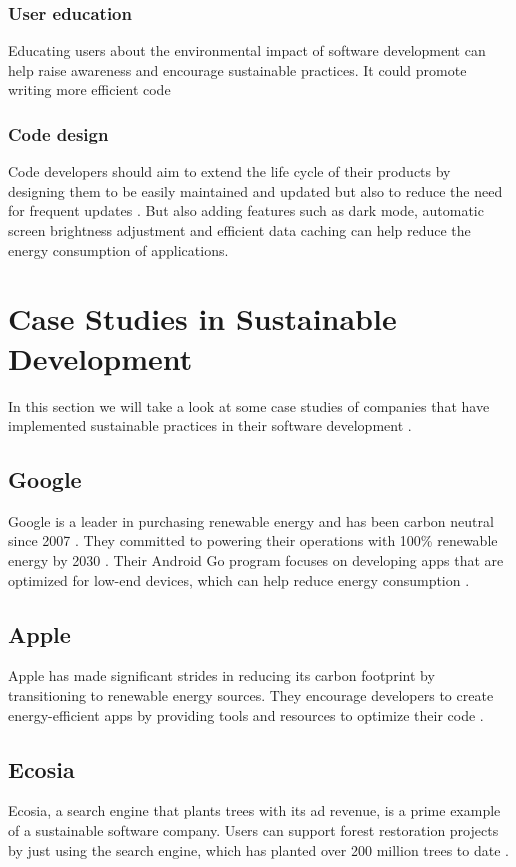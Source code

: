 \subsubsection{User education}
Educating users about the environmental impact of software development can help raise awareness and encourage sustainable practices.
It could promote writing more efficient code

\subsubsection{Code design}
Code developers should aim to extend the life cycle of their products by designing them to be easily maintained and updated but also to reduce the need for frequent updates \autocite{zudu}.
But also adding features such as dark mode, automatic screen brightness adjustment and efficient data caching can help reduce the energy consumption of applications.

\section{Case Studies in Sustainable Development}
In this section we will take a look at some case studies of companies that have implemented sustainable practices in their software development \autocite{linkedin}.

\subsection{Google}
Google is a leader in purchasing renewable energy and has been carbon neutral since 2007 \autocite{google}. They committed to powering their operations with 100\% renewable energy by 2030 \autocite{googlecloud}.
Their Android Go program focuses on developing apps that are optimized for low-end devices, which can help reduce energy consumption \autocite{linkedin}.

\subsection{Apple}
Apple has made significant strides in reducing its carbon footprint by transitioning to renewable energy sources. 
They encourage developers to create energy-efficient apps by providing tools and resources to optimize their code \autocite{linkedin}.

\subsection{Ecosia}
Ecosia, a search engine that plants trees with its ad revenue, is a prime example of a sustainable software company. 
Users can support forest restoration projects by just using the search engine, which has planted over 200 million trees to date \autocite{linkedin}.

